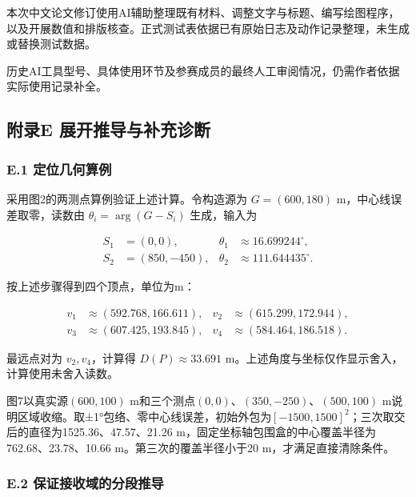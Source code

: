 \documentclass[UTF8,fontset=none,zihao=-4,a4paper]{ctexart}
\begin{document}
本次中文论文修订使用AI辅助整理既有材料、调整文字与标题、编写绘图程序，以及开展数值和排版核查。正式测试表依据已有原始日志及动作记录整理，未生成或替换测试数据。

历史AI工具型号、具体使用环节及参赛成员的最终人工审阅情况，仍需作者依据实际使用记录补全。


\FloatBarrier\clearpage\setcounter{table}{0}
\subsection{附录E 展开推导与补充诊断}\label{ux9644ux5f55e-ux5c55ux5f00ux63a8ux5bfcux4e0eux8865ux5145ux8bcaux65ad}

\subsubsection{E.1 定位几何算例}\label{e.1-ux5b9aux4f4dux51e0ux4f55ux7b97ux4f8b}

采用图2的两测点算例验证上述计算。令构造源为 \(G=(600,180)\) m，中心线误差取零，读数由 \(\theta_i=\arg(G-S_i)\) 生成，输入为

\[
\begin{aligned}
S_1&=(0,0),&\theta_1&\approx16.699244^\circ,\\
S_2&=(850,-450),&\theta_2&\approx111.644435^\circ.
\end{aligned}
\]

按上述步骤得到四个顶点，单位为m：

\[
\begin{aligned}
v_1&\approx(592.768,166.611),&v_2&\approx(615.299,172.944),\\
v_3&\approx(607.425,193.845),&v_4&\approx(584.464,186.518).
\end{aligned}
\]

最远点对为 \(v_2,v_4\)，计算得 \(D(P)\approx33.691\) m。上述角度与坐标仅作显示舍入，计算使用未舍入读数。

图7以真实源\((600,100)\) m和三个测点\((0,0)\)、\((350,-250)\)、\((500,100)\) m说明区域收缩。取±1°包络、零中心线误差，初始外包为\([-1500,1500]^2\)；三次取交后的直径为1525.36、47.57、21.26 m，固定坐标轴包围盒的中心覆盖半径为762.68、23.78、10.66 m。第三次的覆盖半径小于20 m，才满足直接清除条件。

\subsubsection{E.2 保证接收域的分段推导}\label{e.2-ux4fddux8bc1ux63a5ux6536ux57dfux7684ux5206ux6bb5ux63a8ux5bfc}
\end{document}
